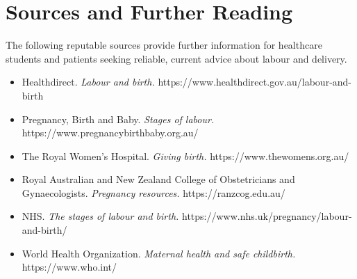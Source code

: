 \section*{Sources and Further Reading}
The following reputable sources provide further information for healthcare students and patients seeking reliable, current advice about labour and delivery.
\begin{itemize}
    \item Healthdirect. \textit{Labour and birth.} https://www.healthdirect.gov.au/labour-and-birth
    \item Pregnancy, Birth and Baby. \textit{Stages of labour.} https://www.pregnancybirthbaby.org.au/
    \item The Royal Women's Hospital. \textit{Giving birth.} https://www.thewomens.org.au/
    \item Royal Australian and New Zealand College of Obstetricians and Gynaecologists. \textit{Pregnancy resources.} https://ranzcog.edu.au/
    \item NHS. \textit{The stages of labour and birth.} https://www.nhs.uk/pregnancy/labour-and-birth/
    \item World Health Organization. \textit{Maternal health and safe childbirth.} https://www.who.int/
\end{itemize}
